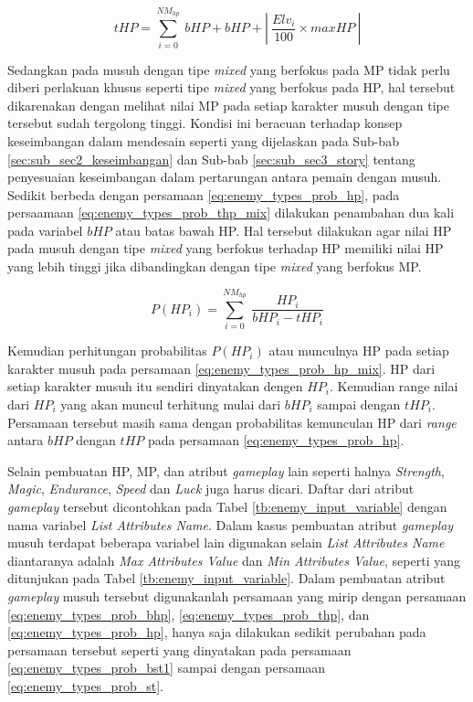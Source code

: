 \begin{equation}\label{eq:enemy_types_prob_thp_mix}
tHP = \sum_{i=0}^{NM_{hp}}\ bHP + bHP + \left |\ \frac{Elv_{i}}{100} \times maxHP\ \right |
\end{equation}

Sedangkan pada musuh dengan tipe \textit{mixed} yang berfokus pada MP tidak perlu diberi perlakuan khusus seperti tipe \textit{mixed} yang berfokus pada HP, hal tersebut dikarenakan dengan melihat nilai MP pada setiap karakter musuh dengan tipe tersebut sudah tergolong tinggi. Kondisi ini beracuan terhadap konsep keseimbangan dalam mendesain seperti yang dijelaskan pada Sub-bab \ref{sec:sub_sec2_keseimbangan} dan Sub-bab \ref{sec:sub_sec3_story} tentang penyesuaian keseimbangan dalam pertarungan antara pemain dengan musuh. Sedikit berbeda dengan persamaan \ref{eq:enemy_types_prob_hp}, pada persaamaan \ref{eq:enemy_types_prob_thp_mix} dilakukan penambahan dua kali pada variabel $bHP$ atau batas bawah HP. Hal tersebut dilakukan agar nilai HP pada musuh dengan tipe \textit{mixed} yang berfokus terhadap HP memiliki nilai HP yang lebih tinggi jika dibandingkan dengan tipe \textit{mixed} yang berfokus MP.
\vspace{1ex}

\begin{equation}\label{eq:enemy_types_prob_hp_mix}
P(HP_{i}) = \sum_{i=0}^{NM_{hp}}\ \frac{HP_{i}}{bHP_{i} - tHP_{i}}
\end{equation}

Kemudian perhitungan probabilitas $P(HP_{i})$ atau munculnya HP pada setiap karakter musuh pada persamaan \ref{eq:enemy_types_prob_hp_mix}. HP dari setiap karakter musuh itu sendiri dinyatakan dengen $HP_{i}$. Kemudian range nilai dari $HP_{i}$ yang akan muncul terhitung mulai dari $bHP_{i}$ sampai dengan $tHP_{i}$. Persamaan tersebut masih sama dengan probabilitas kemunculan HP dari \textit{range} antara $bHP$ dengan $tHP$ pada persamaan \ref{eq:enemy_types_prob_hp}.
\vspace{1ex}

Selain pembuatan HP, MP, dan atribut \textit{gameplay} lain seperti halnya \textit{Strength}, \textit{Magic}, \textit{Endurance}, \textit{Speed} dan \textit{Luck} juga harus dicari. Daftar dari atribut \textit{gameplay} tersebut dicontohkan pada Tabel \ref{tb:enemy_input_variable} dengan nama variabel \textit{List Attributes Name}. Dalam kasus pembuatan atribut \textit{gameplay} musuh terdapat beberapa variabel lain digunakan selain \textit{List Attributes Name} diantaranya adalah \textit{Max Attributes Value} dan \textit{Min Attributes Value}, seperti yang ditunjukan pada Tabel \ref{tb:enemy_input_variable}. Dalam pembuatan atribut \textit{gameplay} musuh tersebut digunakanlah persamaan yang mirip dengan persamaan \ref{eq:enemy_types_prob_bhp}, \ref{eq:enemy_types_prob_thp}, dan \ref{eq:enemy_types_prob_hp}, hanya saja dilakukan sedikit perubahan pada persamaan tersebut seperti yang dinyatakan pada persamaan \ref{eq:enemy_types_prob_bst1} sampai dengan persamaan \ref{eq:enemy_types_prob_st}.
\vspace{1ex}

